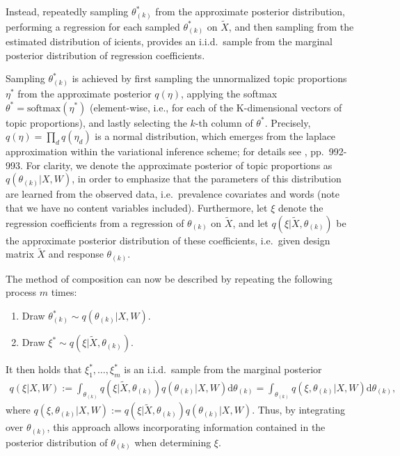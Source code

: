 Instead, repeatedly sampling $\theta_{(k)}^*$ from the approximate posterior distribution, performing a regression for each sampled $\theta_{(k)}^*$ on $\tilde{X}$, and then sampling from the estimated distribution of 
icients, provides an i.i.d.\ sample from the marginal posterior distribution of regression coefficients. 

Sampling $\theta_{(k)}^*$ is achieved by first sampling the unnormalized topic proportions $\eta^*$ from the approximate posterior $q(\eta)$, applying the softmax $\theta^* = \text{softmax}(\eta^*)$ (element-wise, i.e., for each of the K-dimensional vectors of topic proportions), and lastly selecting the $k$-th column of $\theta^*$. Precisely, $q(\eta) = \prod_d q(\eta_d)$ is a normal distribution, which emerges from the laplace approximation within the variational inference scheme; for details see \cite{roberts2016model}, pp.\ 992-993. For clarity, we denote the approximate posterior of topic proportions as $q(\theta_{(k)} | X, W)$, in order to emphasize that the parameters of this distribution are learned from the observed data, i.e.\ prevalence covariates and words (note that we have no content variables included). Furthermore, let $\xi$ denote the regression coefficients from a regression of $\theta_{(k)}$ on $\tilde{X}$, and let $q(\xi| \tilde{X}, \theta_{(k)})$ be the approximate posterior distribution of these coefficients, i.e.\ given design matrix $\tilde{X}$ and response $\theta_{(k)}$.

The method of composition can now be described by repeating the following process $m$ times:
\begin{enumerate}
\item Draw $\theta_{(k)}^* \sim q(\theta_{(k)} | X, W)$.
\item Draw $\xi^* \sim q(\xi | \tilde{X}, \theta_{(k)})$.
\end{enumerate}
It then holds that $\xi_1^*, \dots, \xi_m^*$ is an i.i.d.\ sample from the marginal posterior
\begin{align*}
q(\xi | X, W) := \int_{\theta_{(k)}} q(\xi| \tilde{X}, \theta_{(k)}) q(\theta_{(k)} | X, W) \text{d} \theta_{(k)} = \int_{\theta_{(k)}} q(\xi, \theta_{(k)} | X, W) \text{d} \theta_{(k)}, 
\end{align*}
where $q(\xi, \theta_{(k)} | X, W) := q(\xi| \tilde{X}, \theta_{(k)}) q(\theta_{(k)} | X, W)$. Thus, by integrating over $\theta_{(k)}$, this approach allows incorporating information contained in the posterior distribution of $\theta_{(k)}$ when determining $\xi$.

